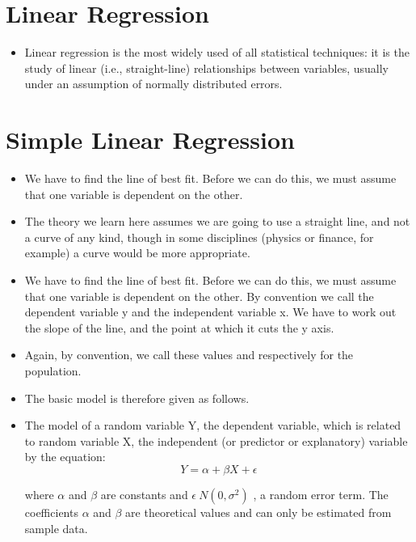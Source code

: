 \documentclass[]{report}
\begin{document}
	\section*{Linear Regression}
	\begin{itemize}
		\item Linear regression is the most widely used of all statistical techniques: it is the study of linear (i.e., straight-line) relationships between variables, usually under an assumption of normally distributed errors.
	\end{itemize}


\section{Simple Linear Regression}
\begin{itemize}
\item	We have to find the line of best fit. Before we can do this, we must assume that one
		variable is dependent on the other. 
		
	\item The theory we learn here assumes we are going to use a straight line, and not a curve of any kind, though in some disciplines (physics or finance, for example) a curve would be more appropriate.
	
	\item We have to find the line of best fit. Before we can do this, we must assume that one
	variable is dependent on the other. By convention we call the dependent variable y
	and the independent variable x. We have to work out the slope of the line, and the
	point at which it cuts the y axis.
	
	\item Again, by convention, we call these values and respectively for the population.
	
	\item The basic model is therefore given as follows.
	
	\item The model of a random variable Y, the dependent variable, which is related to random
	variable X, the independent (or predictor or explanatory) variable by the equation:
	\begin{equation}
	Y = \alpha + \beta X + \epsilon
	\end{equation}
	
	where $\alpha$ and $\beta$ are constants and $\epsilon ~ N ( 0,\sigma^2)$ , a random error term. The
	coefficients $\alpha$ and $\beta$  are theoretical values and can only be estimated from sample data.
\end{itemize}
\end{document}
